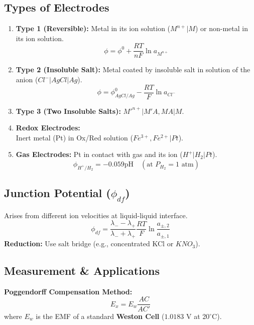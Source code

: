 \subsection{Types of Electrodes}
\begin{enumerate}
    \item \textbf{Type 1 (Reversible):} Metal in its ion solution ($M^{n+}|M$) or non-metal in its ion solution.
        \begin{equation} \phi = \phi^0 + \frac{RT}{nF} \ln a_{M^{n+}} \end{equation}
    \item \textbf{Type 2 (Insoluble Salt):} Metal coated by insoluble salt in solution of the anion ($Cl^-|AgCl|Ag$).
        \begin{equation} \phi = \phi^0_{AgCl/Ag} - \frac{RT}{F} \ln a_{Cl^-} \end{equation}
    \item \textbf{Type 3 (Two Insoluble Salts):} $M'^{n+}|M'A, MA|M$.
    \item \textbf{Redox Electrodes:} \\
    Inert metal (Pt) in Ox/Red solution ($Fe^{3+}, Fe^{2+}|Pt$).
    \item \textbf{Gas Electrodes:} Pt in contact with gas and its ion ($H^+|H_2|Pt$).
        \begin{equation} \phi_{H^+/H_2} = -0.059 \text{pH} \quad (\text{at } P_{H_2} = 1 \text{ atm}) \end{equation}
\end{enumerate}

\subsection{Junction Potential ($\phi_{df}$)}
Arises from different ion velocities at liquid-liquid interface.
\begin{equation}
    \phi_{df} = \frac{\lambda_- - \lambda_+}{\lambda_- + \lambda_+} \frac{RT}{F} \ln \frac{a_{\pm, 2}}{a_{\pm, 1}}
\end{equation}
\textbf{Reduction:} Use salt bridge (e.g., concentrated KCl or $KNO_3$).

\subsection{Measurement \& Applications}
\textbf{Poggendorff Compensation Method:}
\begin{equation}
    E_x = E_w \frac{AC}{AC'}
\end{equation}
where $E_w$ is the EMF of a standard \textbf{Weston Cell} ($1.0183$ V at 20$^{\circ}$C).

